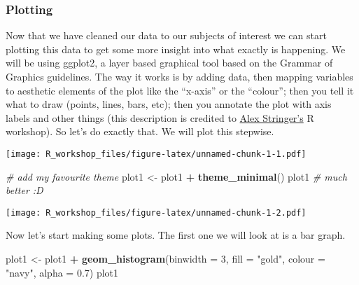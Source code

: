 \documentclass[]{article}
\newenvironment{Shaded}{\begin{snugshade}}{\end{snugshade}}
\newcommand{\CommentTok}[1]{\textcolor[rgb]{0.56,0.35,0.01}{\textit{#1}}}
\newcommand{\DataTypeTok}[1]{\textcolor[rgb]{0.13,0.29,0.53}{#1}}
\newcommand{\DecValTok}[1]{\textcolor[rgb]{0.00,0.00,0.81}{#1}}
\newcommand{\FloatTok}[1]{\textcolor[rgb]{0.00,0.00,0.81}{#1}}
\newcommand{\KeywordTok}[1]{\textcolor[rgb]{0.13,0.29,0.53}{\textbf{#1}}}
\newcommand{\NormalTok}[1]{#1}
\newcommand{\OperatorTok}[1]{\textcolor[rgb]{0.81,0.36,0.00}{\textbf{#1}}}
\newcommand{\StringTok}[1]{\textcolor[rgb]{0.31,0.60,0.02}{#1}}
\begin{document}
\hypertarget{plotting}{%
\subsubsection{Plotting}\label{plotting}}

Now that we have cleaned our data to our subjects of interest we can
start plotting this data to get some more insight into what exactly is
happening. We will be using ggplot2, a layer based graphical tool based
on the Grammar of Graphics guidelines. The way it works is by adding
data, then mapping variables to aesthetic elements of the plot like the
``x-axis'' or the ``colour''; then you tell it what to draw (points,
lines, bars, etc); then you annotate the plot with axis labels and other
things (this description is credited to
\href{https://awstringer1.github.io/ssu-r-workshop/ssu-r-workshop.html}{Alex
Stringer's} R workshop). So let's do exactly that. We will plot this
stepwise.

\begin{Shaded}
\end{Shaded}

\texttt{[image: R\_workshop\_files/figure-latex/unnamed-chunk-1-1.pdf]}

\begin{Shaded}
\begin{Highlighting}[]
\CommentTok{# add my favourite theme }
\NormalTok{plot1 <-}\StringTok{ }\NormalTok{plot1 }\OperatorTok{+}\StringTok{ }\KeywordTok{theme_minimal}\NormalTok{()}
\NormalTok{plot1 }\CommentTok{# much better :D }
\end{Highlighting}
\end{Shaded}

\texttt{[image: R\_workshop\_files/figure-latex/unnamed-chunk-1-2.pdf]}

Now let's start making some plots. The first one we will look at is a
bar graph.

\begin{Shaded}
\begin{Highlighting}[]
\NormalTok{plot1 <-}\StringTok{ }\NormalTok{plot1 }\OperatorTok{+}\StringTok{ }\KeywordTok{geom_histogram}\NormalTok{(}\DataTypeTok{binwidth =} \DecValTok{3}\NormalTok{, }\DataTypeTok{fill =} \StringTok{"gold"}\NormalTok{, }\DataTypeTok{colour =} \StringTok{"navy"}\NormalTok{, }\DataTypeTok{alpha =} \FloatTok{0.7}\NormalTok{)}
\NormalTok{plot1}
\end{Highlighting}
\end{Shaded}
\end{document}
